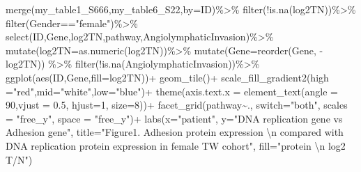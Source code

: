 \documentclass[
]{article}
\newenvironment{Shaded}{\begin{snugshade}}{\end{snugshade}}
\newcommand{\AttributeTok}[1]{\textcolor[rgb]{0.77,0.63,0.00}{#1}}
\newcommand{\DecValTok}[1]{\textcolor[rgb]{0.00,0.00,0.81}{#1}}
\newcommand{\FloatTok}[1]{\textcolor[rgb]{0.00,0.00,0.81}{#1}}
\newcommand{\FunctionTok}[1]{\textcolor[rgb]{0.00,0.00,0.00}{#1}}
\newcommand{\NormalTok}[1]{#1}
\newcommand{\SpecialCharTok}[1]{\textcolor[rgb]{0.00,0.00,0.00}{#1}}
\newcommand{\StringTok}[1]{\textcolor[rgb]{0.31,0.60,0.02}{#1}}
\begin{document}
\begin{Shaded}
\begin{Highlighting}[]
\FunctionTok{merge}\NormalTok{(my\_table1\_S666,my\_table6\_S22,}\AttributeTok{by=}\StringTok{\textquotesingle{}ID\textquotesingle{}}\NormalTok{)}\SpecialCharTok{\%\textgreater{}\%}
  \FunctionTok{filter}\NormalTok{(}\SpecialCharTok{!}\FunctionTok{is.na}\NormalTok{(log2TN))}\SpecialCharTok{\%\textgreater{}\%}
  \FunctionTok{filter}\NormalTok{(Gender}\SpecialCharTok{==}\StringTok{"female"}\NormalTok{)}\SpecialCharTok{\%\textgreater{}\%}
  \FunctionTok{select}\NormalTok{(ID,Gene,log2TN,pathway,AngiolymphaticInvasion)}\SpecialCharTok{\%\textgreater{}\%} 
  \FunctionTok{mutate}\NormalTok{(}\AttributeTok{log2TN=}\FunctionTok{as.numeric}\NormalTok{(log2TN))}\SpecialCharTok{\%\textgreater{}\%}
  \FunctionTok{mutate}\NormalTok{(}\AttributeTok{Gene=}\FunctionTok{reorder}\NormalTok{(Gene, }\SpecialCharTok{{-}}\NormalTok{log2TN)) }\SpecialCharTok{\%\textgreater{}\%}
  \FunctionTok{filter}\NormalTok{(}\SpecialCharTok{!}\FunctionTok{is.na}\NormalTok{(AngiolymphaticInvasion))}\SpecialCharTok{\%\textgreater{}\%} 
  \FunctionTok{ggplot}\NormalTok{(}\FunctionTok{aes}\NormalTok{(ID,Gene,}\AttributeTok{fill=}\NormalTok{log2TN))}\SpecialCharTok{+}
  \FunctionTok{geom\_tile}\NormalTok{()}\SpecialCharTok{+}
  \FunctionTok{scale\_fill\_gradient2}\NormalTok{(}\AttributeTok{high =}\StringTok{"red"}\NormalTok{,}\AttributeTok{mid=}\StringTok{"white"}\NormalTok{,}\AttributeTok{low=}\StringTok{"blue"}\NormalTok{)}\SpecialCharTok{+}
  \FunctionTok{theme}\NormalTok{(}\AttributeTok{axis.text.x =} \FunctionTok{element\_text}\NormalTok{(}\AttributeTok{angle =} \DecValTok{90}\NormalTok{,}\AttributeTok{vjust =} \FloatTok{0.5}\NormalTok{, }\AttributeTok{hjust=}\DecValTok{1}\NormalTok{, }\AttributeTok{size=}\DecValTok{8}\NormalTok{))}\SpecialCharTok{+}
  \FunctionTok{facet\_grid}\NormalTok{(pathway}\SpecialCharTok{\textasciitilde{}}\NormalTok{., }\AttributeTok{switch=}\StringTok{"both"}\NormalTok{, }\AttributeTok{scales =} \StringTok{"free\_y"}\NormalTok{, }\AttributeTok{space =} \StringTok{"free\_y"}\NormalTok{)}\SpecialCharTok{+}
  \FunctionTok{labs}\NormalTok{(}\AttributeTok{x=}\StringTok{"patient"}\NormalTok{,}
       \AttributeTok{y=}\StringTok{"DNA replication gene vs Adhesion gene"}\NormalTok{,}
       \AttributeTok{title=}\StringTok{"Figure1. Adhesion protein expression }\SpecialCharTok{\textbackslash{}n}\StringTok{ compared with DNA replication protein expression in female TW cohort"}\NormalTok{,}
       \AttributeTok{fill=}\StringTok{"protein }\SpecialCharTok{\textbackslash{}n}\StringTok{ log2 T/N"}\NormalTok{)}
\end{Highlighting}
\end{Shaded}
\end{document}
